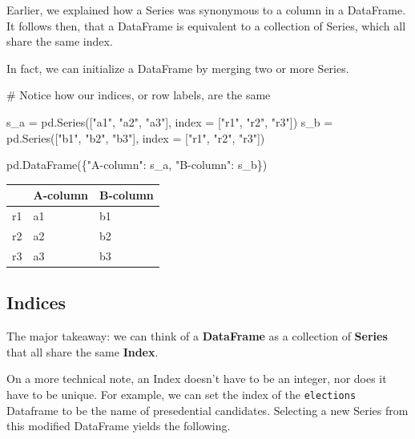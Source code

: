 \documentclass[
  letterpaper,
  DIV=11,
  numbers=noendperiod]{scrreprt}
\newenvironment{Shaded}{\begin{snugshade}}{\end{snugshade}}
\newcommand{\CommentTok}[1]{\textcolor[rgb]{0.37,0.37,0.37}{#1}}
\newcommand{\NormalTok}[1]{\textcolor[rgb]{0.00,0.23,0.31}{#1}}
\newcommand{\OperatorTok}[1]{\textcolor[rgb]{0.37,0.37,0.37}{#1}}
\newcommand{\StringTok}[1]{\textcolor[rgb]{0.13,0.47,0.30}{#1}}
\begin{document}
Earlier, we explained how a Series was synonymous to a column in a
DataFrame. It follows then, that a DataFrame is equivalent to a
collection of Series, which all share the same index.

In fact, we can initialize a DataFrame by merging two or more Series.

\begin{Shaded}
\begin{Highlighting}[]
\CommentTok{\# Notice how our indices, or row labels, are the same}

\NormalTok{s\_a }\OperatorTok{=}\NormalTok{ pd.Series([}\StringTok{"a1"}\NormalTok{, }\StringTok{"a2"}\NormalTok{, }\StringTok{"a3"}\NormalTok{], index }\OperatorTok{=}\NormalTok{ [}\StringTok{"r1"}\NormalTok{, }\StringTok{"r2"}\NormalTok{, }\StringTok{"r3"}\NormalTok{])}
\NormalTok{s\_b }\OperatorTok{=}\NormalTok{ pd.Series([}\StringTok{"b1"}\NormalTok{, }\StringTok{"b2"}\NormalTok{, }\StringTok{"b3"}\NormalTok{], index }\OperatorTok{=}\NormalTok{ [}\StringTok{"r1"}\NormalTok{, }\StringTok{"r2"}\NormalTok{, }\StringTok{"r3"}\NormalTok{])}

\NormalTok{pd.DataFrame(\{}\StringTok{"A{-}column"}\NormalTok{: s\_a, }\StringTok{"B{-}column"}\NormalTok{: s\_b\})}
\end{Highlighting}
\end{Shaded}

\begin{tabular}{lll}
\toprule
{} & A-column & B-column \\
\midrule
r1 &       a1 &       b1 \\
r2 &       a2 &       b2 \\
r3 &       a3 &       b3 \\
\bottomrule
\end{tabular}

\hypertarget{indices}{%
\subsection{Indices}\label{indices}}

The major takeaway: we can think of a \textbf{DataFrame} as a collection
of \textbf{Series} that all share the same \textbf{Index}.

On a more technical note, an Index doesn't have to be an integer, nor
does it have to be unique. For example, we can set the index of the
\texttt{elections} Dataframe to be the name of presedential candidates.
Selecting a new Series from this modified DataFrame yields the
following.
\end{document}
